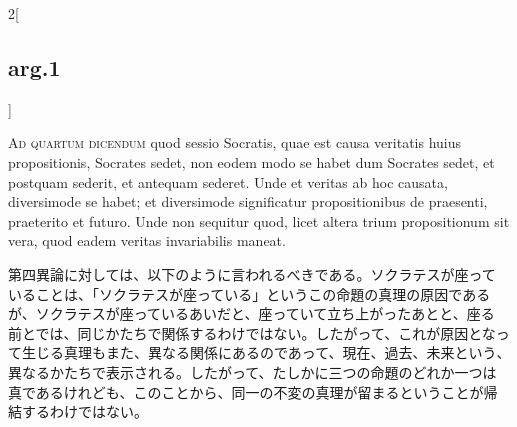 \documentclass[paper=a4paper,fontsize=10pt,jafontsize=9pt,titlepage]{jlreq}
\begin{document}
\begin{paracol}{2}[\subsection{arg.1}]
\switchcolumn*[\subsection{ad.4}]


{\scshape Ad quartum dicendum} quod sessio Socratis, quae est causa
veritatis huius propositionis, Socrates sedet, non eodem modo se habet
dum Socrates sedet, et postquam sederit, et antequam sederet. Unde et
veritas ab hoc causata, diversimode se habet; et diversimode
significatur propositionibus de praesenti, praeterito et futuro. Unde
non sequitur quod, licet altera trium propositionum sit vera, quod
eadem veritas invariabilis maneat.

\switchcolumn

第四異論に対しては、以下のように言われるべきである。ソクラテスが座って
いることは、「ソクラテスが座っている」というこの命題の真理の原因である
が、ソクラテスが座っているあいだと、座っていて立ち上がったあとと、座る
前とでは、同じかたちで関係するわけではない。したがって、これが原因となっ
て生じる真理もまた、異なる関係にあるのであって、現在、過去、未来という、
異なるかたちで表示される。したがって、たしかに三つの命題のどれか一つは
真であるけれども、このことから、同一の不変の真理が留まるということが帰
結するわけではない。

\end{paracol}
\end{document}
